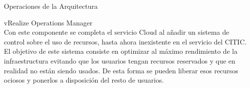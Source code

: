 \begin{subsection}{Operaciones de la Arquitectura}
\begin{subsubsection}{vRealize Operations Manager}
        \\
        Con este componente se completa el servicio Cloud al añadir un sistema de control sobre el uso de recursos, hasta ahora inexistente en el servicio del CITIC. El objetivo de este sistema consiste en optimizar al máximo rendimiento de la infraestructura evitando que los usuarios tengan recursos reservados y que en realidad no están siendo usados. De esta forma se pueden liberar esos recursos ociosos y ponerlos a disposición del resto de usuarios.
    \end{subsubsection}

    
\end{subsection}